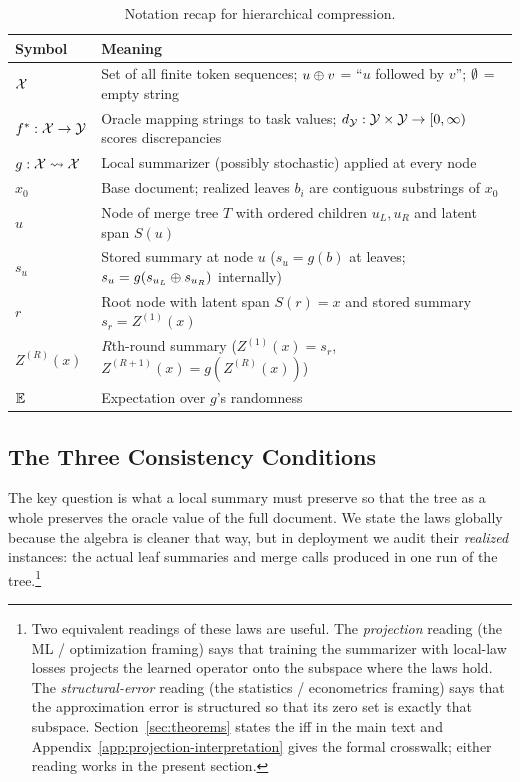 \begin{table}[t]
\centering\small
\begin{tabular}{ll}
\toprule
Symbol & Meaning \\
\midrule
$\mathcal{X}$ & Set of all finite token sequences; $u \oplus v$ = ``$u$ followed by $v$''; $\emptyset$ = empty string \\
$f^\ast: \mathcal{X} \to \mathcal{Y}$ & Oracle mapping strings to task values; $d_{\mathcal{Y}}: \mathcal{Y} \times \mathcal{Y} \to [0,\infty)$ scores discrepancies \\
$g: \mathcal{X} \rightsquigarrow \mathcal{X}$ & Local summarizer (possibly stochastic) applied at every node \\
$x_0$ & Base document; realized leaves $b_i$ are contiguous substrings of $x_0$ \\
$u$ & Node of merge tree $T$ with ordered children $u_L,u_R$ and latent span $S(u)$ \\
$s_u$ & Stored summary at node $u$ ($s_u=g(b)$ at leaves; $s_u=g(s_{u_L}\oplus s_{u_R})$ internally) \\
$r$ & Root node with latent span $S(r)=x$ and stored summary $s_r = Z^{(1)}(x)$ \\
$Z^{(R)}(x)$ & $R$th-round summary ($Z^{(1)}(x)=s_r$, $Z^{(R+1)}(x)=g(Z^{(R)}(x))$) \\
$\mathbb{E}$ & Expectation over $g$'s randomness \\
\bottomrule
\end{tabular}
\caption{Notation recap for hierarchical compression.}
\label{tab:notation-main}
\end{table}

\subsection{The Three Consistency Conditions}

The key question is what a local summary must preserve so that the tree as a whole preserves the oracle value of the full document. We state the laws globally because the algebra is cleaner that way, but in deployment we audit their \emph{realized} instances: the actual leaf summaries and merge calls produced in one run of the tree.\footnote{Two equivalent readings of these laws are useful. The \emph{projection} reading (the ML / optimization framing) says that training the summarizer with local-law losses projects the learned operator onto the subspace where the laws hold. The \emph{structural-error} reading (the statistics / econometrics framing) says that the approximation error is structured so that its zero set is exactly that subspace. Section~\ref{sec:theorems} states the iff in the main text and Appendix~\ref{app:projection-interpretation} gives the formal crosswalk; either reading works in the present section.}

